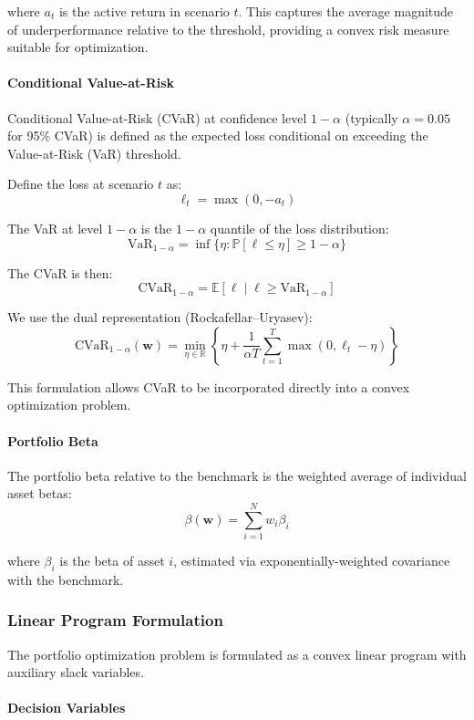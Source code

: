 where $a_t$ is the active return in scenario $t$. This captures the average magnitude of underperformance relative to the threshold, providing a convex risk measure suitable for optimization.

\paragraph{Conditional Value-at-Risk}

Conditional Value-at-Risk (CVaR) at confidence level $1 - \alpha$ (typically $\alpha = 0.05$ for 95\% CVaR) is defined as the expected loss conditional on exceeding the Value-at-Risk (VaR) threshold.

Define the loss at scenario $t$ as:
\[
\ell_t = \max(0, -a_t)
\]

The VaR at level $1 - \alpha$ is the $1-\alpha$ quantile of the loss distribution:
\[
\text{VaR}_{1-\alpha} = \inf\{\eta : \mathbb{P}[\ell \leq \eta] \geq 1 - \alpha\}
\]

The CVaR is then:
\[
\text{CVaR}_{1-\alpha} = \mathbb{E}[\ell \mid \ell \geq \text{VaR}_{1-\alpha}]
\]

We use the dual representation (Rockafellar--Uryasev):
\[
\text{CVaR}_{1-\alpha}(\mathbf{w}) = \min_{\eta \in \mathbb{R}} \left\{ \eta + \frac{1}{\alpha T} \sum_{t=1}^{T} \max(0, \ell_t - \eta) \right\}
\]

This formulation allows CVaR to be incorporated directly into a convex optimization problem.

\paragraph{Portfolio Beta}

The portfolio beta relative to the benchmark is the weighted average of individual asset betas:
\[
\beta(\mathbf{w}) = \sum_{i=1}^{N} w_i \beta_i
\]

where $\beta_i$ is the beta of asset $i$, estimated via exponentially-weighted covariance with the benchmark.

\subsubsection{Linear Program Formulation}

The portfolio optimization problem is formulated as a convex linear program with auxiliary slack variables.

\paragraph{Decision Variables}

